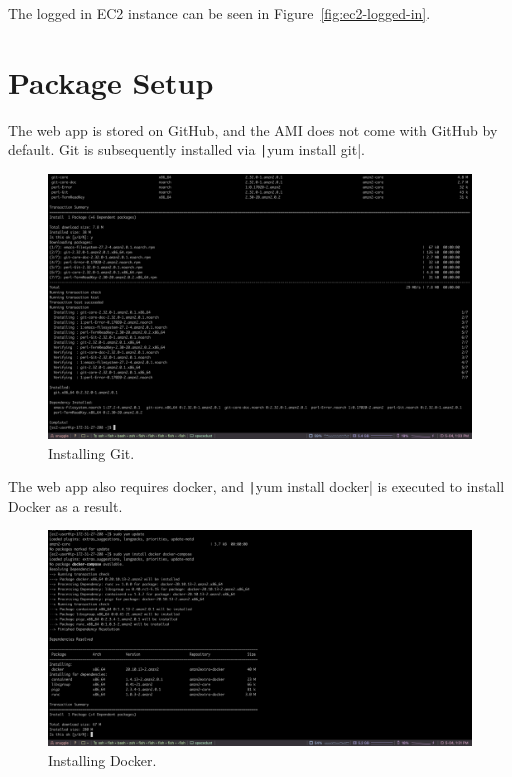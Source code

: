 The logged in EC2 instance can be seen in Figure~\ref{fig:ec2-logged-in}.

\clearpage
\section{Package Setup}\label{sec:web-app-setup}

The web app is stored on GitHub, and the AMI does not come with GitHub by default.
Git is subsequently installed via \texttt|yum install git|.

\begin{figure}[!htbp]
    \centering
    \includegraphics[width=140mm]{resources/ec2/installing-git}
    \caption{Installing Git.}
    \label{fig:webapp-git}
\end{figure}

The web app also requires docker, and \texttt|yum install docker| is executed to install Docker as a result.

\begin{figure}[!htbp]
    \centering
    \includegraphics[width=140mm]{resources/ec2/installing-docker}
    \caption{Installing Docker.}
    \label{fig:webapp-docker}
\end{figure}


